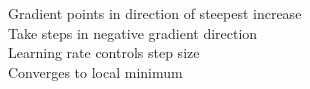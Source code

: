 \documentclass[preview]{standalone}
\begin{document}
Gradient points in direction of steepest increase\\Take steps in negative gradient direction\\Learning rate controls step size\\Converges to local minimum\\
\end{document}
